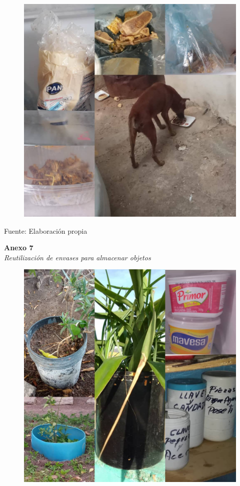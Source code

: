 \begin{figure}[!ht]
    \centering
    \includegraphics[width=15cm]{Media/Fotos/Foto 2 huesos.jpeg}
    \label{fig:anexo6}
\end{figure}

\setlength{\parindent}{0ex}

Fuente: Elaboración propia

\newpage

\textbf{Anexo 7} \\
\textit{Reutilización de envases para almacenar objetos}

\begin{figure}[!ht]
    \centering
    \includegraphics[width=15cm]{Media/Fotos/Foto 3 envases.jpeg}
    \label{fig:anexo7}
\end{figure}


